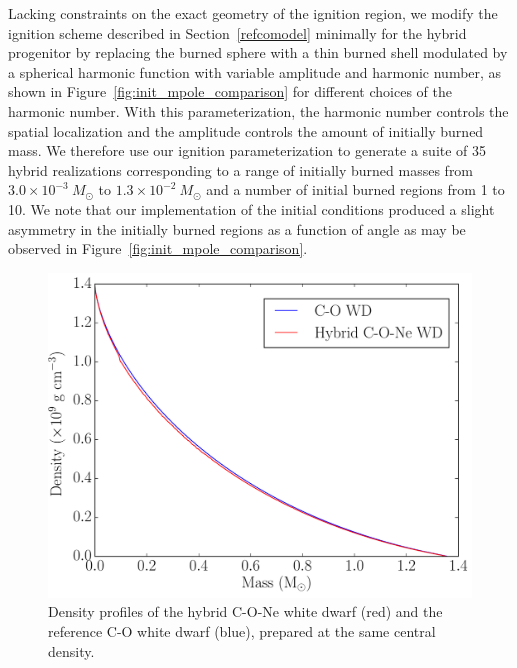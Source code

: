 \documentclass[iop,apj]{emulateapj}
\newcommand{\figref}[1]{Figure~\ref{#1}}
\newcommand{\secref}[1]{Section~\ref{#1}}
\newcommand{\Msun}{\ensuremath{M_\odot}}
\begin{document}
Lacking constraints on the exact geometry of the ignition region, we
modify the ignition scheme described in \secref{refcomodel} minimally
for the hybrid progenitor by replacing the burned sphere with a thin
burned shell modulated by a spherical harmonic function with variable
amplitude and harmonic number, as shown in
\figref{fig:init_mpole_comparison} for different choices of the
harmonic number.  With this parameterization, the harmonic number
controls the spatial localization and the amplitude controls the
amount of initially burned mass.  We therefore use our ignition
parameterization to generate a suite of 35 hybrid realizations
corresponding to a range of initially burned masses from $3.0\times
10^{-3}~\Msun$ to $1.3\times 10^{-2}~\Msun$ and a number of initial
burned regions from 1 to 10. We note that our implementation of 
the initial conditions produced a slight asymmetry in the initially burned
regions as a function of angle as may be observed in \figref{fig:init_mpole_comparison}.

\begin{figure}[!ht]
	\includegraphics[width=\linewidth]{figures/compare/CO_vs_CONe_Density.pdf}
	\caption{\label{fig:co_vs_cone_density} Density profiles of the hybrid C-O-Ne white dwarf (red) and the reference C-O white dwarf (blue), prepared at the same central density.}
\end{figure}
\end{document}

